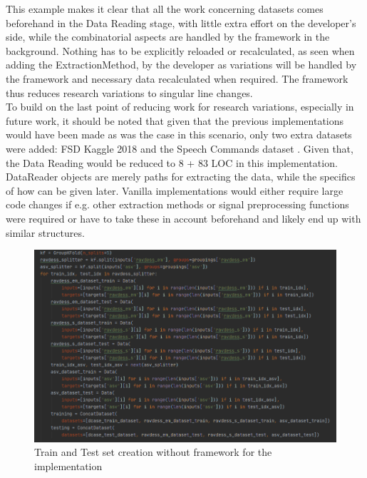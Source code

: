 This example makes it clear that all the work concerning datasets comes beforehand in the Data Reading stage, with little extra effort on the developer's side, while the combinatorial aspects are handled by the framework in the background. Nothing has to be explicitly reloaded or recalculated, as seen when adding the ExtractionMethod, by the developer as variations will be handled by the framework and necessary data recalculated when required. The framework thus reduces research variations to singular line changes.\\

To build on the last point of reducing work for research variations, especially in future work, it should be noted that given that the previous implementations would have been made as was the case in this scenario, only two extra datasets were added: FSD Kaggle 2018 \cite{fonseca2017freesound} and the Speech Commands dataset  \cite{warden2018speech}. Given that, the Data Reading would be reduced to 8 + 83 LOC in this implementation. DataReader objects are merely paths for extracting the data, while the specifics of how can be given later. Vanilla implementations would either require large code changes if e.g. other extraction methods or signal preprocessing functions were required or have to take these in account beforehand and likely end up with similar structures. \\


\begin{figure}
	\centering
	\includegraphics[width=\linewidth]{screenshot002}
	\caption{Train and Test set creation without framework for the \cite{georgiev2017low} implementation}
	\label{fig:screenshot002}
\end{figure}

